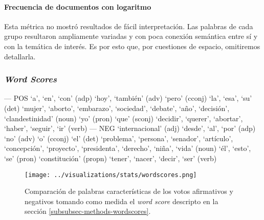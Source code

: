 \paragraph{Frecuencia de documentos con logaritmo}
Esta métrica no mostró resultados de fácil interpretación. Las palabras de cada
grupo resultaron ampliamente variadas y con poca conexión semántica
entre sí y con la temática de interés. Es por esto que, por cuestiones de espacio,
omitiremos detallarla.

\subsubsection{\textit{Word Scores}}

--- POS
`a', `en', `con' (adp)
`hoy', `también' (adv)
`pero' (cconj)
`la', `esa', `su' (det)
`mujer', `aborto', `embarazo', `sociedad', `debate', `año', `decisión', `clandestinidad' (noun)
`yo' (pron)
`que' (sconj)
`decidir', `querer', `abortar', `haber', `seguir', `ir' (verb)
--- NEG
`internacional' (adj)
`desde', `al', `por' (adp)
`no' (adv)
`o' (cconj)
`el' (det)
`problema', `persona', `senador', `artículo', `concepción', `proyecto', `presidenta', `derecho', `niña', `vida' (noun)
`él', `esto', `se' (pron)
`constitución' (propn)
`tener', `nacer', `decir', `ser' (verb)

\begin{figure}[h!]
    \centering
    \texttt{[image: ../visualizations/stats/wordscores.png]}
    \caption{Comparación de palabras características de los votos afirmativos y
    negativos tomando como medida el \textit{word score} descripto
    en la sección \ref{subsubsec-methods-wordscores}.}
    \label{fig-statistics-wordscores}
\end{figure}
